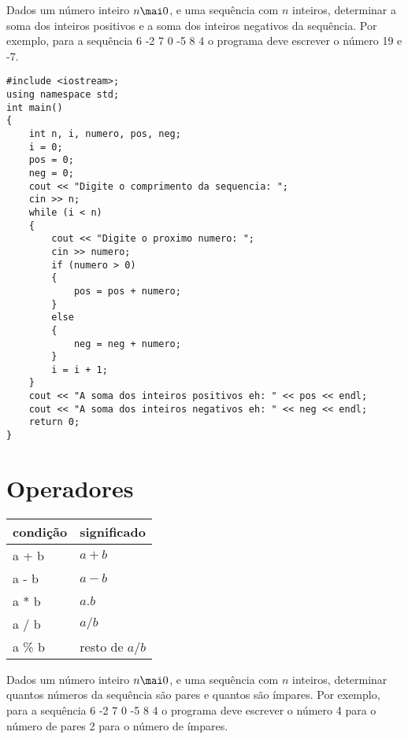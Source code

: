 \documentclass[a4paper]{memoir}
\begin{document}
\begin{prob}\label{prob105.cpp}
Dados um número inteiro $n \mai 0$, e uma sequência com $n$ inteiros, determinar a soma dos inteiros positivos e a soma dos inteiros negativos da sequência. Por exemplo, para a sequência 6 -2 7 0 -5 8 4 o programa deve escrever o número 19 e -7.
\end{prob}

\begin{sol}

\begin{lstlisting}
#include <iostream>;
using namespace std;
int main()
{
    int n, i, numero, pos, neg;
    i = 0;
    pos = 0;
    neg = 0;
    cout << "Digite o comprimento da sequencia: ";
    cin >> n;
    while (i < n)
    {
        cout << "Digite o proximo numero: ";
        cin >> numero;
        if (numero > 0)
        {
            pos = pos + numero;
        }
        else
        {
            neg = neg + numero;
        }
        i = i + 1;
    }
    cout << "A soma dos inteiros positivos eh: " << pos << endl;
    cout << "A soma dos inteiros negativos eh: " << neg << endl;
    return 0;
}
\end{lstlisting}

\end{sol}

\section{Operadores}

\begin{center}
\begin{tabular}{l|l}
  condição & significado\\
  \hline
  a + b  & $a + b$\\
  a - b  & $a - b$\\
  a * b  & $a . b$\\
  a / b  & $a / b$\\
  a \% b  & resto de $a / b$\\
\end{tabular}
\end{center}

\begin{prob}\label{prob106.cpp}
Dados um número inteiro $n \mai 0$, e uma sequência com $n$ inteiros, determinar quantos números da sequência são pares e quantos são ímpares. Por exemplo, para a sequência 6 -2 7 0 -5 8 4 o programa deve escrever o número 4 para o número de pares 2 para o número de ímpares.
\end{prob}
\end{document}
